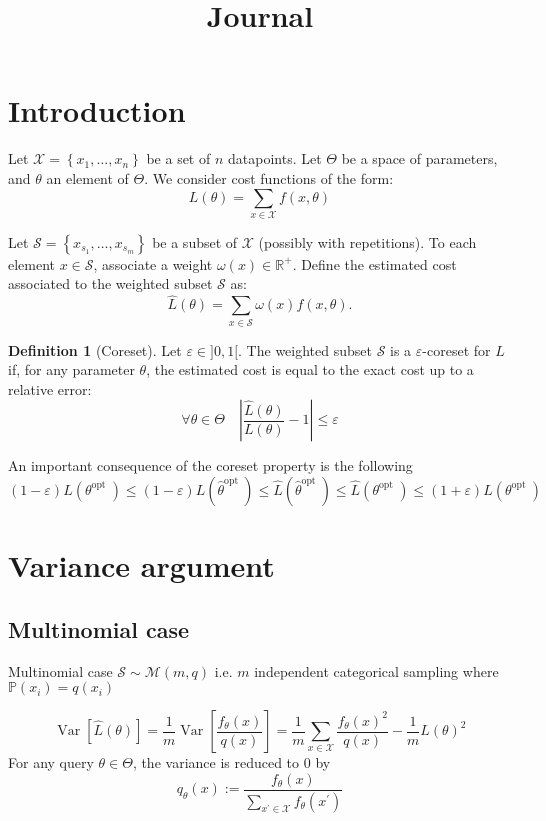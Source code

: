 \documentclass{article}
\title{Journal}
\renewcommand{\epsilon}{\varepsilon}
\theoremstyle{definition}
\newtheorem{definition}{Definition}[section]
\begin{document}
	
	\maketitle
	
	\section{Introduction}
	
	Let $\mathcal{X}=\left\{x_{1}, \ldots, x_{n}\right\}$ be a set of $n$ datapoints. Let $\Theta$ be a space of parameters, and $\theta$ an element of $\Theta$. We consider cost functions of the form:
	$$
	L(\theta)=\sum_{x \in \mathcal{X}} f(x, \theta)
	$$
	
	Let $\mathcal{S}=\left\{x_{s_{1}}, \ldots, x_{s_{m}}\right\}$ be a subset of $\mathcal{X}$ (possibly with repetitions). To each element $x \in \mathcal{S}$, associate a weight $\omega\left(x\right) \in \mathbb{R}^{+}$. Define the estimated cost associated to the weighted subset $\mathcal{S}$ as:
	$$
	\hat{L}(\theta)=\sum_{x \in \mathcal{S}} \omega\left(x\right) f\left(x, \theta\right) .
	$$
	\begin{definition}[Coreset]
			Let $\epsilon \in {]}0,1{[}$. The weighted subset $\mathcal{S}$ is a $\epsilon$-coreset for $L$ if, for any parameter $\theta$, the estimated cost is equal to the exact cost up to a relative error:
		$$
		\forall \theta \in \Theta \quad\left|\frac{\hat{L}(\theta)}{L(\theta)}-1\right| \le \epsilon 
		$$
	\end{definition}

An important consequence of the coreset property is the following
$$
(1-\epsilon) L\left(\theta^{\text {opt }}\right) \le(1-\epsilon) L\left( \hat{\theta}^{\text {opt }}\right) \le \hat{L}\left( \hat{\theta}^{\text {opt }}\right) \le \hat{L}\left( \theta^{\text {opt }}\right) \le(1+\epsilon) L\left( \theta^{\text {opt }}\right)
$$



\section{Variance argument}
\subsection{Multinomial case}
Multinomial case $\mathcal S \sim \mathcal M(m, q)$ i.e. $m$ independent categorical sampling where $\mathbb P(x_i)  = q(x_i)$

$$
	\operatorname{Var}[\hat L(\theta)] =\frac{1}{m} \operatorname{Var}\left[\frac {f_{\theta}(x)} {q(x)}\right] 
	=\frac{1}{m} \sum_{x \in \mathcal{X}} \frac{f_{\theta}(x)^{2}}{q(x)} -\frac{1}{m} L(\theta)^{2}
$$
For any query $\theta \in \Theta$, the variance is reduced to 0 by
$$
q_{\theta}(x):=\frac{ f_{\theta}(x)}{\sum_{x^{\prime} \in \mathcal{X}}  f_{\theta}\left(x^{\prime}\right)}
$$
\end{document}
